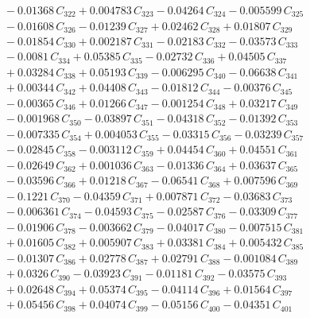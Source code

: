 \documentclass[a4paper,11pt]{article}
\begin{document}
\begin{align}
&\quad - 0.01368\,C_{322} + 0.004783\,C_{323} - 0.04264\,C_{324} - 0.005599\,C_{325} \nonumber\\
&\quad - 0.01608\,C_{326} - 0.01239\,C_{327} + 0.02462\,C_{328} + 0.01807\,C_{329} \nonumber\\
&\quad - 0.01854\,C_{330} + 0.002187\,C_{331} - 0.02183\,C_{332} - 0.03573\,C_{333} \nonumber\\
&\quad - 0.0081\,C_{334} + 0.05385\,C_{335} - 0.02732\,C_{336} + 0.04505\,C_{337} \nonumber\\
&\quad + 0.03284\,C_{338} + 0.05193\,C_{339} - 0.006295\,C_{340} - 0.06638\,C_{341} \nonumber\\
&\quad + 0.00344\,C_{342} + 0.04408\,C_{343} - 0.01812\,C_{344} - 0.00376\,C_{345} \nonumber\\
&\quad - 0.00365\,C_{346} + 0.01266\,C_{347} - 0.001254\,C_{348} + 0.03217\,C_{349} \nonumber\\
&\quad - 0.001968\,C_{350} - 0.03897\,C_{351} - 0.04318\,C_{352} - 0.01392\,C_{353} \nonumber\\
&\quad - 0.007335\,C_{354} + 0.004053\,C_{355} - 0.03315\,C_{356} - 0.03239\,C_{357} \nonumber\\
&\quad - 0.02845\,C_{358} - 0.003112\,C_{359} + 0.04454\,C_{360} + 0.04551\,C_{361} \nonumber\\
&\quad - 0.02649\,C_{362} + 0.001036\,C_{363} - 0.01336\,C_{364} + 0.03637\,C_{365} \nonumber\\
&\quad - 0.03596\,C_{366} + 0.01218\,C_{367} - 0.06541\,C_{368} + 0.007596\,C_{369} \nonumber\\
&\quad - 0.1221\,C_{370} - 0.04359\,C_{371} + 0.007871\,C_{372} - 0.03683\,C_{373} \nonumber\\
&\quad - 0.006361\,C_{374} - 0.04593\,C_{375} - 0.02587\,C_{376} - 0.03309\,C_{377} \nonumber\\
&\quad - 0.01906\,C_{378} - 0.003662\,C_{379} - 0.04017\,C_{380} - 0.007515\,C_{381} \nonumber\\
&\quad + 0.01605\,C_{382} + 0.005907\,C_{383} + 0.03381\,C_{384} + 0.005432\,C_{385} \nonumber\\
&\quad - 0.01307\,C_{386} + 0.02778\,C_{387} + 0.02791\,C_{388} - 0.001084\,C_{389} \nonumber\\
&\quad + 0.0326\,C_{390} - 0.03923\,C_{391} - 0.01181\,C_{392} - 0.03575\,C_{393} \nonumber\\
&\quad + 0.02648\,C_{394} + 0.05374\,C_{395} - 0.04114\,C_{396} + 0.01564\,C_{397} \nonumber\\
&\quad + 0.05456\,C_{398} + 0.04074\,C_{399} - 0.05156\,C_{400} - 0.04351\,C_{401} \nonumber\\

\end{align}
\end{document}
